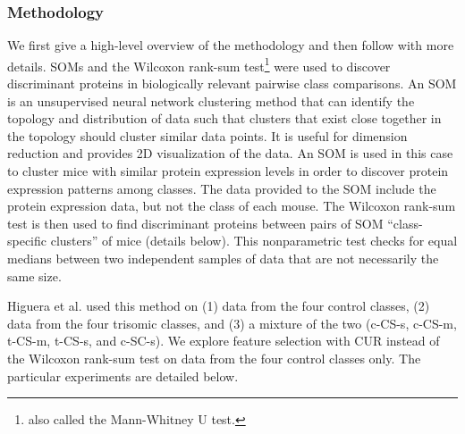 \documentclass[12pt]{article}
\begin{document}
\subsubsection{Methodology}

We first give a high-level overview of the methodology and then follow with more details.  SOMs and the Wilcoxon rank-sum test\footnote{also called the Mann-Whitney U test.} were used to discover discriminant proteins in biologically relevant pairwise class comparisons. An SOM is an unsupervised neural network clustering method that can identify the topology and distribution of data such that clusters that exist close together in the topology should cluster similar data points.  It is useful for dimension reduction and provides 2D visualization of the data.  An SOM is used in this case to cluster mice with similar protein expression levels in order to discover protein expression patterns among classes.  The data provided to the SOM include the protein expression data, but not the class of each mouse.  The Wilcoxon rank-sum test is then used to find discriminant proteins between pairs of SOM ``class-specific clusters'' of mice (details below).  This nonparametric test checks for equal medians between two independent samples of data that are not necessarily the same size. 

Higuera et al. used this method on (1) data from the four control classes, (2) data from the four trisomic classes, and (3) a mixture of the two (c-CS-s, c-CS-m, t-CS-m, t-CS-s, and c-SC-s).  We explore feature selection with CUR instead of the Wilcoxon rank-sum test on data from the four control classes only.  The particular experiments are detailed below.
\end{document}
